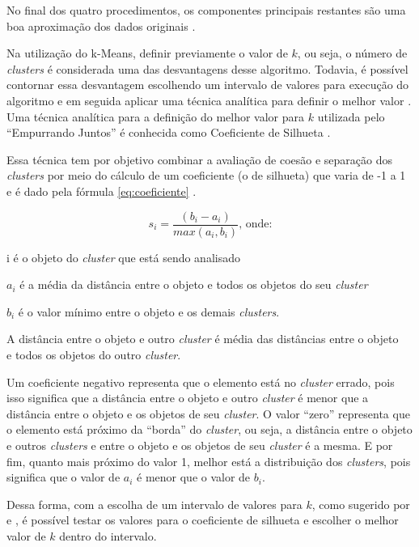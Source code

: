 No final dos quatro procedimentos, os componentes principais restantes são uma boa aproximação dos dados originais \cite{han2011data}.

Na utilização do k-Means, definir previamente o valor de $k$, ou seja, o número de \textit{clusters} é considerada uma das desvantagens desse algoritmo. Todavia,
é possível contornar essa desvantagem escolhendo um intervalo de valores para execução do algoritmo e em seguida aplicar
uma técnica analítica para definir o melhor valor \cite{han2011data}. Uma técnica analítica para a definição do melhor valor para $k$ utilizada pelo ``Empurrando Juntos''
é conhecida como Coeficiente de Silhueta \cite{sklearn}.

Essa técnica tem por objetivo combinar a avaliação de coesão e separação dos \textit{clusters} por meio do cálculo de um coeficiente (o de silhueta) que 
varia de -1 a 1 e é dado pela fórmula \ref{eq:coeficiente} \cite{tan2013data}.

\begin{equation} \label{eq:coeficiente}
  s_{i} = \frac{(b_{i} - a_{i})}{max(a_{i}, b_{i})} \mbox{, onde:}
\end{equation}

{\addtolength{\leftskip}{8mm}
    i é o objeto do \textit{cluster} que está sendo analisado
    
    $a_{i}$ é a média da distância entre o objeto e todos os objetos do seu \textit{cluster}
    
    $b_{i}$ é o valor mínimo entre o objeto e os demais \textit{clusters}. 
    
	  \footnotesize \indent \indent A distância entre o objeto e outro \textit{cluster} é média das distâncias entre o objeto \\ \indent \indent e todos os objetos do outro \textit{cluster}.
}

Um coeficiente negativo representa que o elemento está no \textit{cluster} errado, pois isso significa que a distância entre o objeto e outro \textit{cluster} 
é menor que a distância entre o objeto e os objetos de seu \textit{cluster}. O valor ``zero'' representa que o elemento está próximo da ``borda'' do \textit{cluster}, ou seja,
a distância entre o objeto e outros \textit{clusters} e entre o objeto e os objetos de seu \textit{cluster} é a mesma. E por fim, quanto mais próximo do valor 1, melhor
está a distribuição dos \textit{clusters}, pois significa que o valor de $a_i$ é menor que o valor de $b_i$.

Dessa forma, com a escolha de um intervalo de valores para $k$, como sugerido por  e , é possível testar os valores 
para o coeficiente de silhueta e escolher o melhor valor de $k$ dentro do intervalo. 

